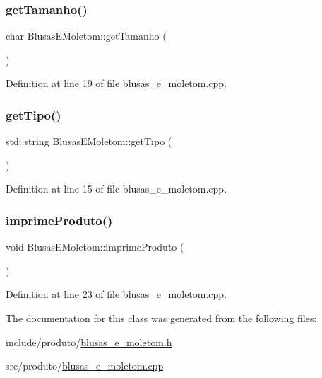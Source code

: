 \subsubsection{\texorpdfstring{get\+Tamanho()}{getTamanho()}}
{\footnotesize\ttfamily char Blusas\+E\+Moletom\+::get\+Tamanho (\begin{DoxyParamCaption}{ }\end{DoxyParamCaption})}



Definition at line 19 of file blusas\+\_\+e\+\_\+moletom.\+cpp.

\mbox{\label{class_blusas_e_moletom_a15a35daa601730aa8b724761ca261931}} 
\subsubsection{\texorpdfstring{get\+Tipo()}{getTipo()}}
{\footnotesize\ttfamily std\+::string Blusas\+E\+Moletom\+::get\+Tipo (\begin{DoxyParamCaption}{ }\end{DoxyParamCaption})}



Definition at line 15 of file blusas\+\_\+e\+\_\+moletom.\+cpp.

\mbox{\label{class_blusas_e_moletom_aff1f34b5847d9304f0b4169f59df0277}} 
\subsubsection{\texorpdfstring{imprime\+Produto()}{imprimeProduto()}}
{\footnotesize\ttfamily void Blusas\+E\+Moletom\+::imprime\+Produto (\begin{DoxyParamCaption}{ }\end{DoxyParamCaption})}



Definition at line 23 of file blusas\+\_\+e\+\_\+moletom.\+cpp.



The documentation for this class was generated from the following files\+:\begin{DoxyCompactItemize}
\item 
include/produto/\hyperlink{blusas__e__moletom_8h}{blusas\+\_\+e\+\_\+moletom.\+h}\item 
src/produto/\hyperlink{blusas__e__moletom_8cpp}{blusas\+\_\+e\+\_\+moletom.\+cpp}\end{DoxyCompactItemize}
